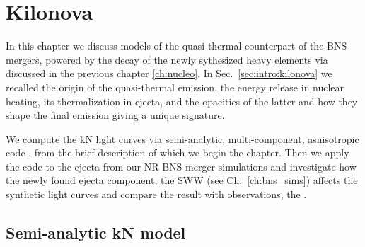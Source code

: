 \chapter{Kilonova} \label{ch:kilonova} 

In this chapter we discuss models of the quasi-thermal counterpart 
of the \ac{BNS} mergers, powered by the decay of the newly sythesized heavy 
elements via \rproc{} \nuc{} discussed in the previous chapter \ref{ch:nucleo}.
%
In Sec.~\ref{sec:intro:kilonova} we recalled the origin of the quasi-thermal emission, 
the energy release in nuclear heating, its thermalization in ejecta, and the 
opacities of the latter and how they shape the final emission giving a unique 
signature. 
%

We compute the \ac{kN} light curves via 
semi-analytic, multi-component, asnisotropic code \mkn{} 
\citep{Perego:2017wtu,Barbieri:2019sjc,Breschi:2021wzr},
from the brief description of which we begin the chapter.
%
Then we apply the code \mkn{} to the ejecta from our \ac{NR} \ac{BNS} 
merger simulations and investigate how the newly found ejecta component, the 
\ac{SWW} (see Ch.~\ref{ch:bns_sims}) affects the synthetic light curves and 
compare the result with observations, the \AT{}.


\section{Semi-analytic \ac{kN} model}

